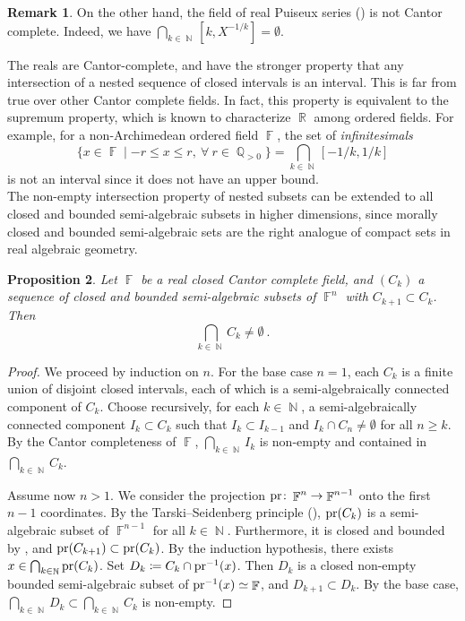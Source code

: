 \documentclass{amsart}
\theoremstyle{plain}
\newtheorem{proposition}{Proposition}[section]
\theoremstyle{definition}
\newtheorem{remark}[proposition]{Remark}
\DeclareMathOperator{\N}{{\mathbb{N}}}
\DeclareMathOperator{\Fb}{{\mathbb{F}}}
\DeclareMathOperator{\Nb}{{\mathbb{N}}}
\DeclareMathOperator{\Rb}{{\mathbb{R}}}
\DeclareMathOperator{\Qb}{\mathbb{Q}}
\newcommand*\from{\colon}
\newcommand{\pr}{\textnormal{pr}}
\newcommand{\1}{\mathbf{1}}
\begin{document}
\begin{remark}
   On the other hand, the field of real Puiseux series () is not Cantor complete. 
Indeed, we have $\bigcap_{k \in \Nb} [k,X^{-1/k}] = \emptyset$. 
\end{remark}


The reals are Cantor-complete, and have the stronger property that any intersection of a nested sequence of closed intervals is an interval. This is far from true over other Cantor complete fields. In fact, this property is equivalent to the supremum property, which is known to characterize $\Rb$ among ordered fields. For example, for a non-Archimedean ordered field $\Fb$, the set of \emph{infinitesimals}
\[ \{x \in \Fb\mid -r\leq x \leq r, \ \forall\ r\in \Qb_{>0}\} = \bigcap_{k \in \Nb}[-1/k,1/k]\]
is not an interval since it does not have an upper bound.\\

The non-empty intersection property of nested subsets can be extended to all closed and bounded semi-algebraic subsets in higher dimensions, since morally closed and bounded semi-algebraic sets are the right analogue of compact sets in real algebraic geometry.

\begin{proposition}\label{propo: cantor complete closed sets intersect non-empty}
    Let $\Fb$ be a real closed Cantor complete field, and $(C_k)$ a sequence of closed and bounded semi-algebraic subsets of $\Fb^n$ with $C_{k+1}\subset C_k$.
    Then 
    \[\bigcap_{k\in \Nb} C_k \neq \emptyset~.\]
\end{proposition}
\begin{proof}
    We proceed by induction on $n$.
    For the base case $n=1$, each $C_k$ is a finite union of disjoint closed intervals, each of which is a semi-algebraically connected component of $C_k$. Choose recursively, for each $k\in\Nb$, a semi-algebraically connected component $I_k \subset C_k$ such that $I_{k}\subset I_{k-1}$ and $I_k \cap C_n \neq \emptyset$ for all $n\geq k$. By the Cantor completeness of $\Fb$, $\bigcap_{k\in \Nb} I_k$ is non-empty and contained in $\bigcap_{k\in \Nb} C_k$.

    Assume now $n > 1$.
    We consider the projection $\pr \from \Fb^n \to \Fb^{n-1}$ onto the first $n-1$ coordinates.
    By the Tarski--Seidenberg principle (), $\pr(C_k)$ is a semi-algebraic subset of $\Fb^{n-1}$ for all $k\in \N$.
    Furthermore, it is closed and bounded by , and $\pr(C_{k+1})\subset \pr(C_k)$.
    By the induction hypothesis, there exists $x\in \bigcap_{k\in \Nb} \pr(C_k)$. Set $D_k \coloneqq C_k \cap \pr^{-1}(x)$. Then $D_k$ is a closed non-empty bounded semi-algebraic subset of $\pr^{-1}(x)\simeq \Fb$, and $D_{k+1} \subset D_k$. By the base case, $\bigcap_{k\in \Nb} D_k \subset \bigcap_{k\in \Nb} C_k$ is non-empty.
\end{proof}
\end{document}
